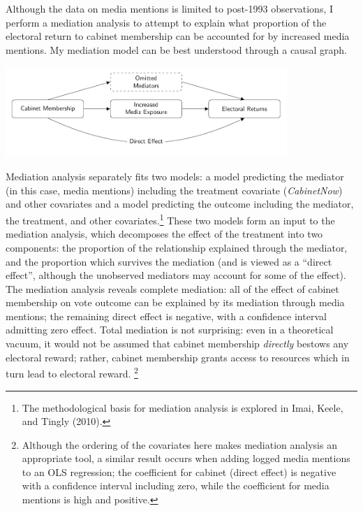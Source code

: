 \documentclass[letter,12pt]{article}
\begin{document}
Although the data on media mentions is limited to post-1993 observations, I perform a mediation analysis to attempt to explain what proportion of the electoral return to cabinet membership can be accounted for by increased media mentions. My mediation model can be best understood through a causal graph.

\begin{center}
	\includegraphics[width = 0.8\textwidth]{Includes/flowchart}
\end{center}

Mediation analysis separately fits two models: a model predicting the mediator (in this case, media mentions) including the treatment covariate (\textit{CabinetNow}) and other covariates and a model predicting the outcome including the mediator, the treatment, and other covariates.\footnote{The methodological basis for mediation analysis is explored in Imai, Keele, and Tingly (2010).} These two models form an input to the mediation analysis, which decomposes the effect of the treatment into two components: the proportion of the relationship explained through the mediator, and the proportion which survives the mediation (and is viewed as a ``direct effect'', although the unobserved mediators may account for some of the effect). The mediation analysis reveals complete mediation: all of the effect of cabinet membership on vote outcome can be explained by its mediation through media mentions; the remaining direct effect is negative, with a confidence interval admitting zero effect. Total mediation is not surprising: even in a theoretical vacuum, it would not be assumed that cabinet membership \textit{directly} bestows any electoral reward; rather, cabinet membership grants access to resources which in turn lead to electoral reward. \footnote{Although the ordering of the covariates here makes mediation analysis an appropriate tool, a similar result occurs when adding logged media mentions to an OLS regression; the coefficient for cabinet (direct effect) is negative with a confidence interval including zero, while the coefficient for media mentions is high and positive.}
\end{document}
